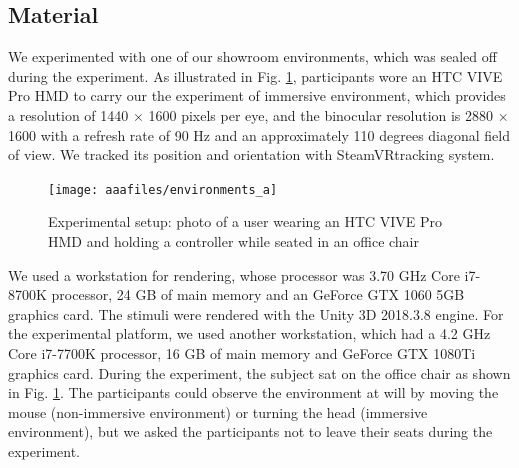 \documentclass[sigconf]{acmart}
\begin{document}

\subsection{Material}


We experimented with one of our showroom environments, which was sealed off during the experiment. As illustrated in Fig. \ref{fig:environments_a}, participants wore an HTC VIVE Pro HMD to carry our the experiment of immersive environment, which provides a resolution of 1440 $\times$ 1600 pixels per eye, and the binocular resolution is 2880 $\times$ 1600 with a refresh rate of 90 Hz and an approximately 110 degrees diagonal field of view. We tracked its position and orientation with SteamVR\texttrademark tracking system. 

\begin{figure}[h]
      \centering
      \texttt{[image: aaafiles/environments\_a]}
      \caption{Experimental setup: photo of a user wearing an HTC VIVE Pro HMD and holding a controller while seated in an office chair}
      \label{fig:environments_a}
\end{figure}

We used a workstation for rendering, whose processor was 3.70 GHz Core i7-8700K processor, 24 GB of main memory and an GeForce GTX 1060 5GB graphics card. The stimuli were rendered with the Unity 3D 2018.3.8 engine. For the experimental platform, we used another workstation, which had a 4.2 GHz Core i7-7700K processor, 16 GB of main memory and GeForce GTX 1080Ti graphics card. During the experiment, the subject sat on the office chair as shown in Fig. \ref{fig:environments_a}. The participants could observe the environment at will by moving the mouse (non-immersive environment) or turning the head (immersive environment), but we asked the participants not to leave their seats during the experiment.
\end{document}
